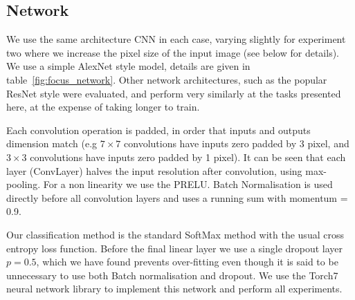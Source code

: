 \subsection {Network}

We use the same architecture CNN in each case, varying slightly for experiment two where we increase the pixel size of the input image (see below for details). We use a simple AlexNet \cite {Krizhevsky2012} style model, details are given in table~\ref{fig:focus_network}. Other network architectures, such as the popular ResNet \cite{He2015} style were evaluated, and perform very similarly at the tasks presented here, at the expense of taking longer to train.

Each convolution operation is padded, in order that inputs and outputs dimension match (e.g $ 7\times7 $ convolutions have inputs zero padded by 3 pixel, and $3\times3$ convolutions have inputs zero padded by 1 pixel). It can be seen that each layer (ConvLayer) halves the input resolution after convolution, using max-pooling. For a non linearity we use the \gls{PRELU}. Batch Normalisation is used directly before all convolution layers and uses a running sum with momentum = 0.9.

Our classification method is the standard SoftMax method with the usual cross entropy loss function. Before the final linear layer we use a single dropout layer $ p = 0.5 $, which we have found prevents over-fitting even though it is said to be unnecessary to use both Batch normalisation and dropout.  We use the Torch7 \cite{Collobert2011a} neural network library to implement this network and perform all experiments. 

